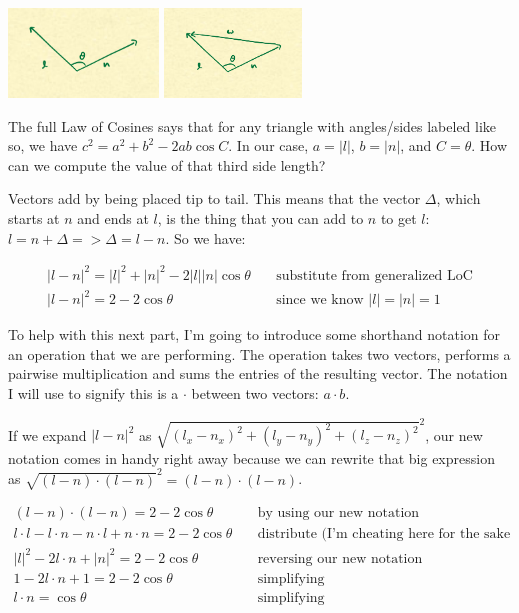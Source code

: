 \documentclass{article}
\begin{document}
\begin{center}
	\includegraphics[width=0.3\textwidth,frame]{assets/ln.jpg}
	\hspace{0.2\textwidth}
	\includegraphics[width=0.2735\textwidth,frame]{assets/lnw.jpg}
\end{center}

The full Law of Cosines says that for any triangle with angles/sides labeled like so, we have $c^2 = a^2 + b^2 - 2ab \cos C$.
In our case, $a = |l|$, $b = |n|$, and $C = \theta$.
How can we compute the value of that third side length?

Vectors add by being placed tip to tail.
This means that the vector $\Delta$, which starts at $n$ and ends at $l$, is the thing that you can add to $n$ to get $l$: $l = n + \Delta => \Delta = l - n$.
So we have:

\begin{align*}
|l-n|^2 = |l|^2 + |n|^2 - 2 |l| |n| \cos \theta & \quad \text{substitute from generalized LoC} \\
|l-n|^2 = 2 - 2 \cos \theta & \quad \text{since we know } |l| = |n| = 1
\end{align*}

To help with this next part, I'm going to introduce some shorthand notation for an operation that we are performing.
The operation takes two vectors, performs a pairwise multiplication and sums the entries of the resulting vector.
The notation I will use to signify this is a $\cdot$ between two vectors: $a \cdot b$.

If we expand $|l - n|^2$ as $\sqrt{(l_x - n_x)^2 + (l_y - n_y)^2 + (l_z - n_z)^2} ^2$, our new notation comes in handy right away because we can rewrite that big expression as $\sqrt{(l - n) \cdot (l - n)}^2 = (l-n) \cdot (l - n)$.

\begin{align*}
(l - n) \cdot (l - n) = 2 - 2 \cos \theta & \quad \text{by using our new notation} \\
l \cdot l - l \cdot n - n \cdot l + n \cdot n = 2 - 2 \cos \theta & \quad \text{distribute (I'm cheating here for the sake of brevity)} \\
|l|^2 - 2 l \cdot n + |n|^2 = 2 - 2 \cos \theta & \quad \text{reversing our new notation} \\
1 - 2 l \cdot n + 1 = 2 - 2 \cos \theta & \quad \text{simplifying} \\
l \cdot n = \cos \theta & \quad \text{simplifying}
\end{align*}
\end{document}
